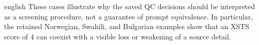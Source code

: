 \begin{otherlanguage*}{english}
These cases illustrate why the saved QC decisions should be interpreted as a
screening procedure, not a guarantee of prompt equivalence. In particular,
the retained Norwegian, Swahili, and Bulgarian examples show that an XSTS
score of 4 can coexist with a visible loss or weakening of a source detail.

\end{otherlanguage*}
